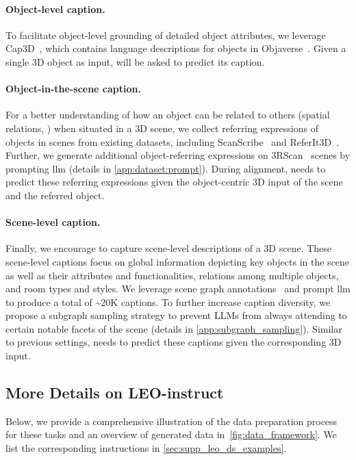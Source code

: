 \paragraph{Object-level caption.} To facilitate object-level grounding of detailed object attributes, we leverage Cap3D~\citep{luo2023scalable}, which contains language descriptions for objects in Objaverse~\citep{deitke2023objaverse}. Given a single 3D object as input, \agent will be asked to predict its caption.

\paragraph{Object-in-the-scene caption.} For a better understanding of how an object can be related to others (spatial relations, \etc) when situated in a 3D scene, we collect referring expressions of objects in scenes from existing datasets, including ScanScribe~\citep{zhu20233d} and ReferIt3D~\citep{achlioptas2020referit3d}. Further, we generate additional object-referring expressions on 3RScan~\citep{wald2019rio} scenes by prompting \ac{llm} (details in \cref{app:dataset:prompt}).
During alignment, \agent needs to predict these referring expressions given the object-centric 3D input of the scene and the referred object.

\paragraph{Scene-level caption.} Finally, we encourage \agent to capture scene-level descriptions of a 3D scene. These scene-level captions focus on global information depicting key objects in the scene as well as their attributes and functionalities, relations among multiple objects, and room types and styles. We leverage scene graph annotations~\citep{wald2019rio} and prompt \ac{llm} to produce a total of \textasciitilde{}20K captions. 
To further increase caption diversity, we propose a subgraph sampling strategy to prevent LLMs from always attending to certain notable facets of the scene (details in \cref{app:subgraph_sampling}). Similar to previous settings, \agent needs to predict these captions given the corresponding 3D input.

\subsection{More Details on LEO-instruct}\label{app:dataset:leo_instruct}

Below, we provide a comprehensive illustration of the data preparation process for these tasks and an overview of generated data in~\cref{fig:data_framework}. We list the corresponding instructions in \cref{sec:supp_leo_ds_examples}.


